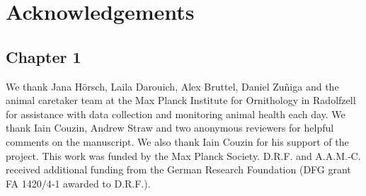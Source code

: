 \documentclass[11pt,a4paper,oneside]{book}
\begin{document}
\begin{doublespace}
\begin{appendices}
\end{appendices}

\nocite{*}

\renewcommand{\bibname}{References}


\chapter*{Acknowledgements}

\section*{Chapter 1}
We thank Jana Hörsch, Laila Darouich, Alex Bruttel, Daniel Zuñiga and the animal caretaker team at the Max Planck Institute for Ornithology in Radolfzell for assistance with data collection and monitoring animal health each day. We thank Iain Couzin, Andrew Straw and two anonymous reviewers for helpful comments on the manuscript. We also thank Iain Couzin for his support of the project. This work was funded by the Max Planck Society. D.R.F. and A.A.M.‐C. received additional funding from the German Research Foundation (DFG grant FA 1420/4‐1 awarded to D.R.F.).


\end{doublespace}
\end{document}
